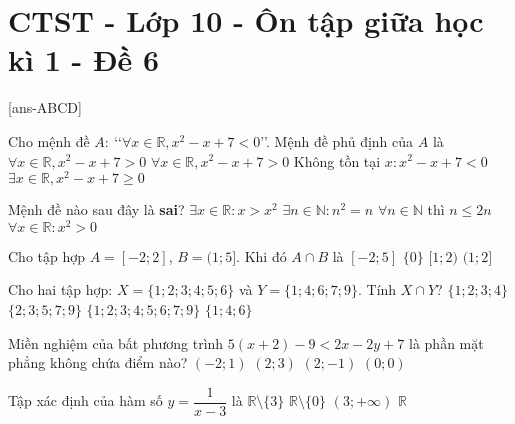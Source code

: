 \section{CTST - Lớp 10 - Ôn tập giữa học kì 1 - Đề 6}
\caulc
{}[ans-ABCD]

\begin{ex}%
	Cho mệnh đề $A:~$\lq\lq $\forall x \in \mathbb{R}, x^2-x+7<0$\rq\rq. Mệnh đề phủ định của $A$ là
	\choice
	{$\forall x \in \mathbb{R}, x^2-x+7>0$}
	{$\forall x \in \mathbb{R}, x^2-x+7>0$}
	{Không tồn tại $x: x^2-x+7<0$}
	{\True$\exists x \in \mathbb{R}, x^2-x+7 \geq 0$}
\end{ex}
\begin{ex}%
	Mệnh đề nào sau đây là \textbf{sai}?
	\choice
	{$\exists x \in \mathbb{R}: x>x^2$}
	{$\exists n \in \mathbb{N}: n^2=n$}
	{$\forall n \in \mathbb{N}$ thì $n \leq 2n$}
	{\True $\forall x \in \mathbb{R}: x^2>0$}
\end{ex}
\begin{ex}%
	Cho tập hợp $A=[-2; 2]$, $B=(1; 5]$. Khi đó $A\cap B$ là
	\choice
	{$[-2; 5]$}
	{$\{0\}$}
	{$[1; 2)$}
	{\True $(1; 2]$}
	\loigiai{
	Ta có $A\cap B = (1; 2]$.}
\end{ex}
\begin{ex}%
	Cho hai tập hợp: $X=\{1; 2; 3; 4; 5; 6\}$ và $Y=\{1; 4; 6; 7; 9\}$. Tính $X \cap Y$?
	\choice
	{$\{1; 2; 3; 4\}$}
	{$\{2; 3; 5; 7; 9\}$}
	{$\{1; 2; 3; 4; 5; 6; 7; 9\}$}
	{\True $\{1; 4; 6\}$}
\end{ex}
\begin{ex}%
	Miền nghiệm của bất phương trình $5(x+2)-9<2 x-2 y+7$ là phần mặt phẳng không chứa điểm nào?
	\choice
	{$(-2; 1)$}
	{\True $(2; 3)$}
	{$(2; -1)$}
	{$(0; 0)$}
\end{ex}
\begin{ex}%
	Tập xác định của hàm số $y=\dfrac{1}{x-3}$ là
	\choice
	{\True $\mathbb{R} \setminus\{3\}$}
	{$\mathbb{R} \setminus\{0\}$}
	{$(3 ;+\infty)$}
	{$\mathbb{R}$}
\end{ex}
